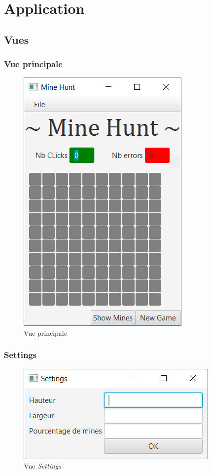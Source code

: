 \documentclass[a4paper, 10pt]{article}
\begin{document}
\section{Application}
\subsection{Vues}
\begin{minipage}{0.5\textwidth}
\subsubsection{Vue principale}
\begin{figure}[H]
\centering
\includegraphics[]{./vprincipale.png}
\caption{Vue principale}
\end{figure}
\end{minipage}
\begin{minipage}{0.5\textwidth}
\subsubsection{Settings}
\begin{figure}[H]
\centering
\includegraphics[]{./vsettings.png}
\caption{Vue \emph{Settings}}
\end{figure}
\end{minipage}
\end{document}
